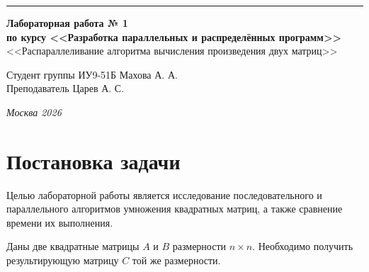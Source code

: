 \documentclass[a4paper, 14pt]{extarticle}
\begin{document}
\begin{titlepage}
\vspace*{-16pt}
\hspace{30pt}\rule{0.866\textwidth}{0.4pt}

\vspace{11em}

\begin{center}
\Large {\bf Лабораторная работа № 1} \\

\large {\bf по курсу <<Разработка параллельных и распределённых программ>>} \\[0.8cm]

\large <<Распараллеливание алгоритма вычисления
произведения двух матриц>>
\end{center}
\normalsize

\vspace{8em}\begin{flushright}
  {Студент группы ИУ9-51Б Махова А. А. \hspace*{15pt}\\
  \vspace{2ex}
  Преподаватель Царев А. С.\hspace*{15pt}}
\end{flushright}

\bigskip

\vfill


\begin{center}
\textsl{Москва 2026}
\end{center}
\end{titlepage}



\setcounter{page}{2}

\tableofcontents

\newpage



\section{Постановка задачи}

Целью лабораторной работы является исследование последовательного
и параллельного алгоритмов умножения квадратных матриц,
а также сравнение времени их выполнения.

Даны две квадратные матрицы $A$ и $B$ размерности $n \times n$.
Необходимо получить результирующую матрицу $C$ той же размерности.
\end{document}
